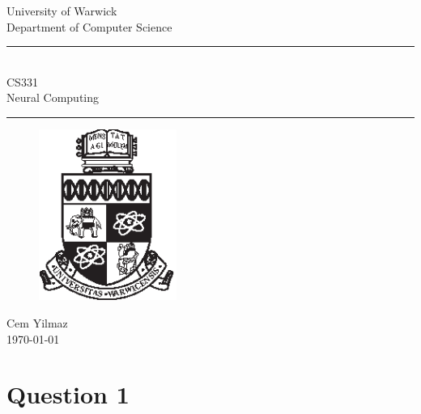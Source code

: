 \documentclass[a4paper]{article}
\theoremstyle{plain}
\theoremstyle{definition}
\theoremstyle{remark}
\begin{document}
	\begin{titlepage}
	\begin{center}
	\large
	University of Warwick \\
	Department of Computer Science \\
	\huge
	\vspace{50mm}
	\rule{\linewidth}{0.5pt} \\
	CS331 \\
	\vspace{5mm}
	\Large
	Neural Computing
	\rule{\linewidth}{0.5pt}
	\vspace{5mm}
	\begin{figure}[H]
	\centering
	\includegraphics[width=0.4\textwidth]{crest_black.eps}
	\end{figure}
	\vspace{37mm}
	Cem Yilmaz \\
	\today
	\end{center}
	\end{titlepage}
	\newpage
	\section{Question 1}
\end{document}
